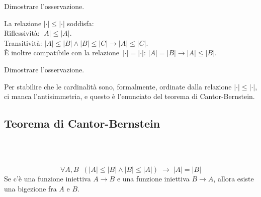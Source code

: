 \begin{exercise}
	Dimostrare l'osservazione.
\end{exercise}

\begin{remark}
	La relazione $|\cdot| \leq |\cdot|$ soddisfa:\\
{\drkblu Riflessivit\`a:} $|A| \leq |A|$.\\
{\drkblu Transitivit\`a:} $|A| \leq |B| \land |B| \leq |C| \rightarrow |A|
\leq |C|$.\\
\`E inoltre {\drkblu compatibile con la relazione~$|\cdot| = |\cdot|$:}
$|A|=|B|\rightarrow |A|\le|B|$.
\end{remark}

\begin{exercise}
	Dimostrare l'osservazione.
\end{exercise}

Per stabilire che le cardinalit\`a sono, formalmente, ordinate dalla
relazione $|\cdot| \leq |\cdot|$, ci manca l'antisimmetria, e questo \`e
l'enunciato del teorema di Cantor-Bernstein.

\subsection{Teorema di Cantor-Bernstein}
\ 

\begin{theorem}
	\label{CB}
\ 
\baselineskip
	\[ \forall {A,B} \;\; (|A| \leq |B| \land |B| \leq |A|)
\;\rightarrow\; |A| = |B|
		\]
	{\drkgrn Se c'\`e una funzione iniettiva $A \rightarrow B$ e una
funzione iniettiva $B \rightarrow A$, allora esiste una bigezione fra $A$
e $B$.}
\end{theorem}

